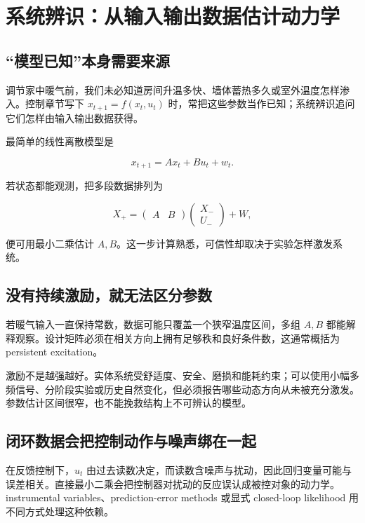 \section{系统辨识：从输入输出数据估计动力学}
\label{sec:16-Control-and-Reinforcement-Learning/01-Optimal-Control/06}

\subsection{``模型已知''本身需要来源}

调节家中暖气前，我们未必知道房间升温多快、墙体蓄热多久或室外温度怎样渗入。控制章节写下 \(x_{t+1}=f(x_t,u_t)\) 时，常把这些参数当作已知；系统辨识追问它们怎样由输入输出数据获得。

最简单的线性离散模型是

\[
x_{t+1}=Ax_t+Bu_t+w_t.
\]

若状态都能观测，把多段数据排列为

\[
X_+=
\begin{pmatrix}A&B\end{pmatrix}
\begin{pmatrix}X_-\\U_-\end{pmatrix}
+W,
\]

便可用最小二乘估计 \(A,B\)。这一步计算熟悉，可信性却取决于实验怎样激发系统。

\subsection{没有持续激励，就无法区分参数}

若暖气输入一直保持常数，数据可能只覆盖一个狭窄温度区间，多组 \(A,B\) 都能解释观察。设计矩阵必须在相关方向上拥有足够秩和良好条件数，这通常概括为 persistent excitation。

激励不是越强越好。实体系统受舒适度、安全、磨损和能耗约束；可以使用小幅多频信号、分阶段实验或历史自然变化，但必须报告哪些动态方向从未被充分激发。参数估计区间很窄，也不能挽救结构上不可辨认的模型。

\subsection{闭环数据会把控制动作与噪声绑在一起}

在反馈控制下，\(u_t\) 由过去读数决定，而读数含噪声与扰动，因此回归变量可能与误差相关。直接最小二乘会把控制器对扰动的反应误认成被控对象的动力学。instrumental variables、prediction-error methods 或显式 closed-loop likelihood 用不同方式处理这种依赖。

